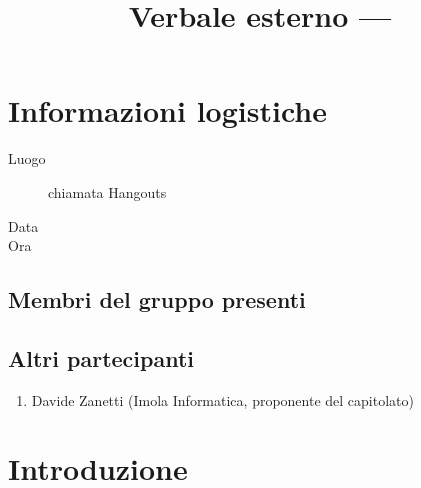 \documentclass{article}
\title{Verbale esterno --- \placeholder{data incontro}}
\begin{document}


\section{Informazioni logistiche}%
\label{sec:informazioni_logistiche}

\begin{description}
  \item [Luogo] chiamata Hangouts
  \item [Data] 
  \item [Ora]   
\end{description}

\subsection{Membri del gruppo presenti}%
\label{sub:membri_del_gruppo_presenti}



\subsection{Altri partecipanti}%
\label{sub:altri_partecipanti}

\begin{enumerate}
  \item Davide Zanetti (Imola Informatica, proponente del capitolato)
\end{enumerate}


\section{Introduzione}%
\label{sec:introduzione}
\end{document}
